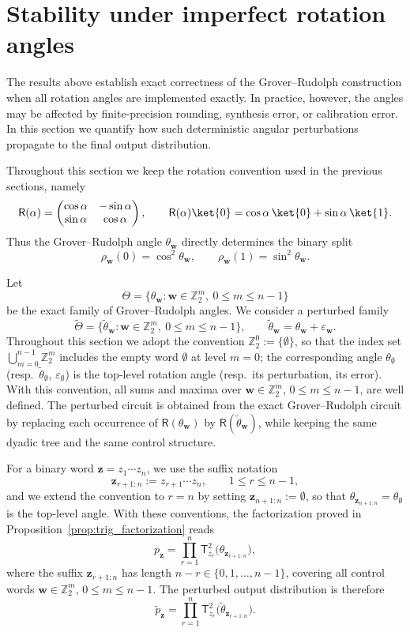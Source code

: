 \documentclass{article}
\newcommand{\rR}{\mathsf{R}}
\numberwithin{equation}{section}
\begin{document}
\section{Stability under imperfect rotation angles}
\label{sec:stability}
The results above establish exact correctness of the Grover--Rudolph
construction when all rotation angles are implemented exactly. In
practice, however, the angles may be affected by finite-precision
rounding, synthesis error, or calibration error. In this section we
quantify how such deterministic angular perturbations propagate to the
final output distribution.

Throughout this section we keep the rotation convention used in the
previous sections, namely
\[
\rR(\alpha)
=
\begin{pmatrix}
\cos\alpha&-\sin\alpha\\
\sin\alpha&\cos\alpha
\end{pmatrix},
\qquad
\rR(\alpha)\ket{0}
=
\cos\alpha\,\ket{0}
+
\sin\alpha\,\ket{1}.
\]
Thus the Grover--Rudolph angle \(\theta_{\mathbf w}\) directly determines
the binary split
\[
\rho_{\mathbf w}(0)=\cos^2\theta_{\mathbf w},
\qquad
\rho_{\mathbf w}(1)=\sin^2\theta_{\mathbf w}.
\]

Let
\[
\Theta
=
\{\theta_{\mathbf w}:
\mathbf w\in\mathbb Z_2^m,\ 0\le m\le n-1\}
\]
be the exact family of Grover--Rudolph angles. We consider a perturbed
family
\[
\widetilde\Theta
=
\{\widetilde\theta_{\mathbf w}:
\mathbf w\in\mathbb Z_2^m,\ 0\le m\le n-1\},
\qquad
\widetilde\theta_{\mathbf w}
=
\theta_{\mathbf w}+\varepsilon_{\mathbf w}.
\]
Throughout this section we adopt the convention
\(\mathbb Z_2^0:=\{\emptyset\}\), so that the index set
\(\bigcup_{m=0}^{n-1}\mathbb Z_2^m\) includes the empty word \(\emptyset\)
at level \(m=0\); the corresponding angle \(\theta_\emptyset\) (resp.\
\(\widetilde\theta_\emptyset\), \(\varepsilon_\emptyset\)) is the
top-level rotation angle (resp.\ its perturbation, its error).
With this convention, all sums and maxima over
\(\mathbf w\in\mathbb Z_2^m\), \(0\le m\le n-1\), are well defined.
The perturbed circuit is obtained from the exact Grover--Rudolph circuit 
by replacing each occurrence of
\(\rR(\theta_{\mathbf w})\) by
\(\rR(\widetilde\theta_{\mathbf w})\), while keeping the same dyadic
tree and the same control structure.

For a binary word \(\mathbf z=z_1\cdots z_n\), we use the suffix notation
\[
\mathbf z_{r+1:n}:=z_{r+1}\cdots z_n,
\qquad
1\le r\le n-1,
\]
and we extend the convention to \(r=n\) by setting
\(\mathbf z_{n+1:n}:=\emptyset\), so that
\(\theta_{\mathbf z_{n+1:n}}=\theta_\emptyset\) is the top-level angle.
With these conventions, the
factorization proved in Proposition~\ref{prop:trig_factorization} reads
\[
p_{\mathbf z}
=
\prod_{r=1}^{n}
\mathsf T_{z_r}^2
\bigl(\theta_{\mathbf z_{r+1:n}}\bigr),
\]
where the suffix $\mathbf z_{r+1:n}$ has length $n-r \in \{0,1,\ldots,n-1\}$,
covering all control words $\mathbf w\in\mathbb Z_2^m$, $0\le m\le n-1$.
The perturbed output
distribution is therefore
\[
\widetilde p_{\mathbf z}
=
\prod_{r=1}^{n}
\mathsf T_{z_r}^2
\bigl(\widetilde\theta_{\mathbf z_{r+1:n}}\bigr).
\]
\end{document}
